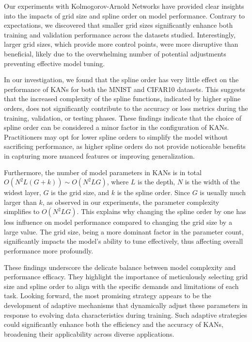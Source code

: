 \documentclass{article}
\begin{document}
\setlength{\parindent}{0pt} %
\setlength{\parskip}{\baselineskip} %

Our experiments with Kolmogorov-Arnold Networks have provided clear insights into the impacts of grid size and spline order on model performance.
Contrary to expectations, we discovered that smaller grid sizes significantly enhance both training and validation performance across the datasets studied.
Interestingly, larger grid sizes, which provide more control points, were more disruptive than beneficial,
likely due to the overwhelming number of potential adjustments preventing effective model tuning.

In our investigation, we found that the spline order has very little effect on the performance of KANs for both the MNIST and CIFAR10 datasets.
This suggests that the increased complexity of the spline functions, indicated by higher spline orders, does not significantly contribute to the accuracy or loss metrics during the training, validation, or testing phases.
These findings indicate that the choice of spline order can be considered a minor factor in the configuration of KANs.
Practitioners may opt for lower spline orders to simplify the model without sacrificing performance, as higher spline orders do not provide noticeable benefits in capturing more nuanced features or improving generalization.

Furthermore, the number of model parameters in KANs is in total \(O(N^2 L (G + k)) \sim O(N^2 LG)\), where \(L\) is the depth, \(N\) is the width of the widest layer, \(G\) is the grid size, and \(k\) is the spline order.
Since \(G\) is usually much larger than \(k\), as observed in our experiments, the parameter complexity simplifies to \(O(N^2 LG)\).
This explains why changing the spline order by one has less influence on model performance compared to changing the grid size by a large value.
The grid size, being a more dominant factor in the parameter count, significantly impacts the model's ability to tune effectively, thus affecting overall performance more profoundly.

These findings underscore the delicate balance between model complexity and performance efficacy.
They highlight the importance of meticulously selecting grid size and spline order to align with the specific demands and limitations of each task.
Looking forward, the most promising strategy appears to be the development of adaptive mechanisms that dynamically adjust these parameters in response to evolving data characteristics during training.
Such adaptive strategies could significantly enhance both the efficiency and the accuracy of KANs, broadening their applicability across diverse applications.


\clearpage %





\end{document}

